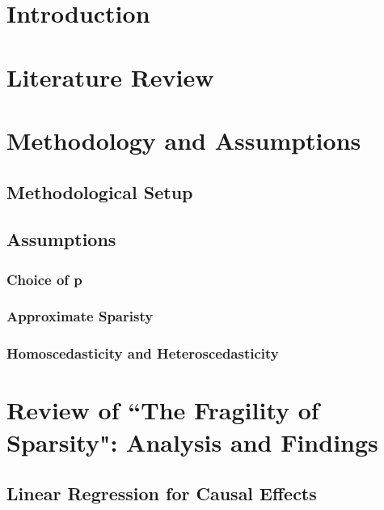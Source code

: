\newpage
\tableofcontents

\newpage


    

\newpage
\section{Introduction}
\label{SDF}

\section{Literature Review}

\section{Methodology and Assumptions}

\subsection{Methodological Setup}

\subsection{Assumptions}

\subsubsection{Choice of p}

\subsubsection{Approximate Sparisty}

\subsubsection{Homoscedasticity and Heteroscedasticity}


\section{Review of ``The Fragility of Sparsity": Analysis and Findings}
\subsection{Linear Regression for Causal Effects}

